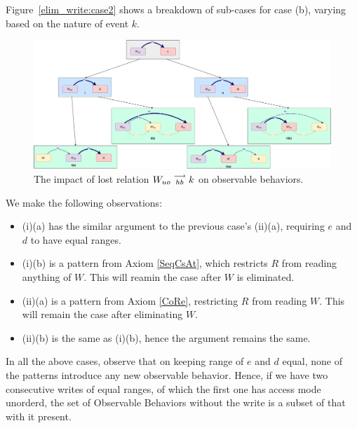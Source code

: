     Figure~\ref{elim_write:case2} shows a breakdown of sub-cases for case (b), varying based
    on the nature of event $k$.
    \begin{figure}[H]
        \centering
        \includegraphics[scale=0.3]{6.Elimination/1.ValidEliminationCandidate/WriteElimProof/ProofParts/Part4Case2.pdf}
        \caption{The impact of lost relation $W_{uo}\stackrel{\longrightarrow}{_{hb}}k$ on observable behaviors.}
        \label{elim_write:case1}
    \end{figure}

    We make the following observations:
    \begin{itemize}
        \item (i)(a) has the similar argument to the previous case's (ii)(a), requiring $e$ and $d$ to have equal ranges.
        \item (i)(b) is a pattern from Axiom \ref{SeqCsAt}, which restricts $R$ from reading anything of $W$. This will reamin the case after $W$ is eliminated. 
        \item (ii)(a) is a pattern from Axiom \ref{CoRe}, restricting $R$ from reading $W$. This will remain the case after eliminating $W$.
        \item (ii)(b) is the same as (i)(b), hence the argument remains the same.  
    \end{itemize}

    In all the above cases, observe that on keeping range of $e$ and $d$ equal, none of the patterns introduce any new observable behavior. Hence, if we have two consecutive writes of equal ranges, of which the first one has access mode unorderd, the set of Observable Behaviors without the write is a subset of that with it present. 

